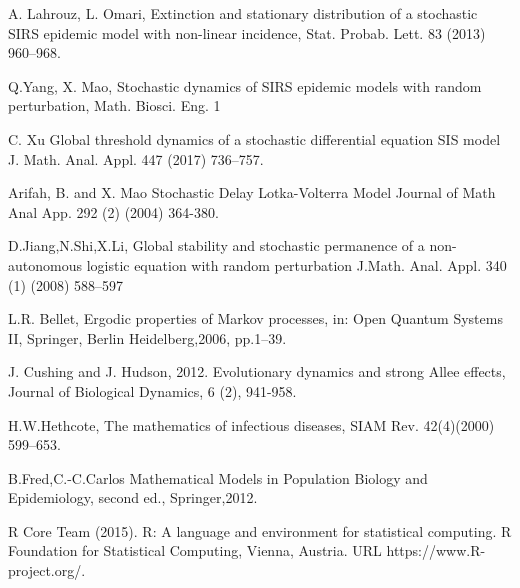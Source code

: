 \begin{thebibliography}{00}
 A. Lahrouz, L. Omari,
\newblock Extinction and stationary distribution of a stochastic SIRS epidemic model with non-linear incidence,
\newblock Stat. Probab. Lett. 83 (2013) 960–968.

 Q.Yang, X. Mao,
\newblock Stochastic dynamics of SIRS epidemic models with random perturbation,
\newblock Math. Biosci. Eng. 1

 C. Xu
\newblock Global threshold dynamics of a stochastic differential equation SIS model
\newblock J. Math. Anal. Appl. 447 (2017) 736–757.

Arifah, B. and X. Mao 
\newblock Stochastic Delay Lotka-Volterra Model 
\newblock Journal of Math Anal App. 292 (2) (2004) 364-380.

 D.Jiang,N.Shi,X.Li,
\newblock Global stability and stochastic permanence of a non-autonomous logistic equation with random perturbation
\newblock J.Math. Anal. Appl. 340 (1) (2008) 588–597

L.R. Bellet,
\newblock Ergodic properties of Markov processes, in: Open Quantum Systems II,
\newblock Springer, Berlin Heidelberg,2006, pp.1–39.

 J. Cushing and J. Hudson, 2012. 
\newblock Evolutionary dynamics and strong Allee effects,
\newblock Journal  of  Biological Dynamics, 6 (2), 941-958.

H.W.Hethcote,
\newblock The mathematics of infectious diseases,
\newblock SIAM Rev. 42(4)(2000) 599–653.

B.Fred,C.-C.Carlos
\newblock Mathematical Models in Population Biology and Epidemiology,
\newblock second ed., Springer,2012.

R Core Team (2015). 
\newblock R: A language and environment for statistical computing. R Foundation for Statistical Computing, Vienna, Austria.
\newblock URL https://www.R-project.org/.

\end{thebibliography}


